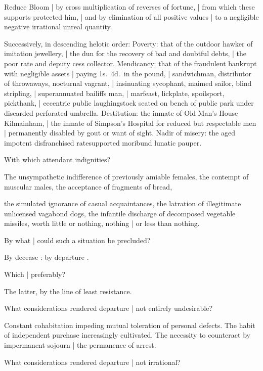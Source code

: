 Reduce Bloom |
by cross multiplication of reverses of fortune, |
from which these supports protected him, |
and by elimination of all positive values |
to a negligible negative irrational unreal quantity.

\Turns
Successively, in descending helotic order:
Poverty:
that of the outdoor hawker of imitation jewellery, |
the dun for the recovery of bad and doubtful debts, |
the poor rate and deputy cess collector.
Mendicancy:
that of the fraudulent bankrupt with negligible assets |
paying 1s.~4d.\ in the pound, |
sandwichman, distributor of throwaways, nocturnal vagrant, |
insinuating sycophant, maimed sailor, blind stripling, |
superannuated bailiffs man, |
marfeast, lickplate, spoilsport, pickthank, |
eccentric public laughingstock seated on bench of public park
under discarded perforated umbrella.
Destitution:
the inmate of Old Man's House
Kilmainham, |
the inmate of Simpson's Hospital for reduced but respectable men |
permanently disabled by gout or want of sight.
Nadir of misery:
the aged impotent disfranchised ratesupported moribund lunatic pauper.


With which attendant indignities?

\Poetry
The unsympathetic indifference of previously amiable females,
the contempt of muscular males,
the acceptance of fragments of bread,

\Science
the simulated ignorance of casual acquaintances,
the latration of illegitimate unlicensed vagabond dogs,
the infantile discharge of decomposed vegetable missiles,
worth little or nothing,
nothing |
or less than nothing.


By what |
could such a situation be precluded?

\Philosophy
By decease
:
by departure
.


Which |
preferably?

\Philosophy
The latter,
by the line of least resistance.


What considerations rendered departure |
not entirely undesirable?

\Factual
Constant cohabitation impeding mutual toleration of personal defects.
The habit of independent purchase increasingly cultivated.
The necessity to counteract by impermanent sojourn |
the permanence of arrest.


What considerations rendered departure |
not irrational?

